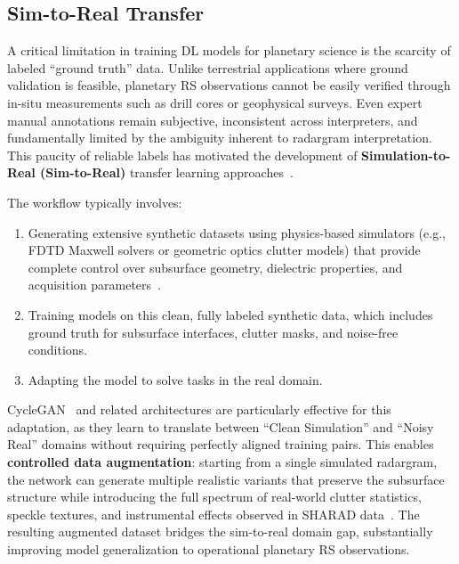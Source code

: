\subsection{Sim-to-Real Transfer}
A critical limitation in training DL models for planetary science is the scarcity of labeled \enquote{ground truth} data.
Unlike terrestrial applications where ground validation is feasible, planetary RS observations cannot be easily verified through in-situ measurements such as drill cores or geophysical surveys.
Even expert manual annotations remain subjective, inconsistent across interpreters, and fundamentally limited by the ambiguity inherent to radargram interpretation.
This paucity of reliable labels has motivated the development of \textbf{Simulation-to-Real (Sim-to-Real)} transfer learning approaches~\cite{Zhu_2017,yebasse2025advances}.

The workflow typically involves:
\begin{enumerate}
    \item Generating extensive synthetic datasets using physics-based simulators (e.g., FDTD Maxwell solvers or geometric optics clutter models) that provide complete control over subsurface geometry, dielectric properties, and acquisition parameters~\cite{Warren_2016}.
    \item Training models on this clean, fully labeled synthetic data, which includes ground truth for subsurface interfaces, clutter masks, and noise-free conditions.
    \item Adapting the model to solve tasks in the real domain.
\end{enumerate}

CycleGAN~\cite{Zhu_2017} and related architectures are particularly effective for this adaptation, as they learn to translate between \enquote{Clean Simulation} and \enquote{Noisy Real} domains without requiring perfectly aligned training pairs.
This enables \textbf{controlled data augmentation}: starting from a single simulated radargram, the network can generate multiple realistic variants that preserve the subsurface structure while introducing the full spectrum of real-world clutter statistics, speckle textures, and instrumental effects observed in SHARAD data~\cite{yebasse2025advances}.
The resulting augmented dataset bridges the sim-to-real domain gap, substantially improving model generalization to operational planetary RS observations.


